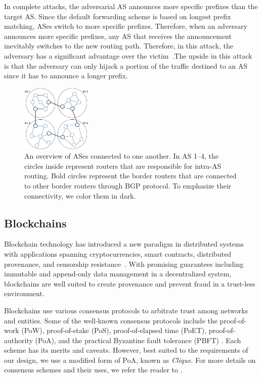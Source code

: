 \documentclass[5p]{elsarticle}
\begin{document}
In complete attacks, the adversarial AS announces more specific prefixes than the target AS. Since the default forwarding scheme is based on longest prefix matching, ASes switch to more specific prefixes. Therefore, when an adversary announces more specific prefixes, any AS that receives the announcement inevitably switches to the new routing path. Therefore, in this attack, the adversary has a significant advantage over the victim~\cite{BGPHijack}.The upside in this attack is that the adversary can only hijack a portion of the traffic destined to an AS since it has to announce a longer prefix.

\begin{figure}[t]
\begin{center}
\includegraphics[width=0.30\textwidth]{fig/ASes.pdf}
\caption{An overview of ASes connected to one another. In AS 1--4, the circles inside represent routers that are responsible for intra-AS routing. Bold circles represent the border routers that are connected to other border routers through BGP protocol. To emphasize their connectivity, we color them in dark.  } 
\label{fig:ASes}
\end{center}

\end{figure}


\subsection{Blockchains} \label{sec:BC}
Blockchain technology has introduced a new paradigm in distributed systems with applications spanning cryptocurrencies, smart contracts, distributed provenance, and censorship resistance~\cite{NeisseSN17,Omohundro14,GovernatoriIMRS18,AhmadSBM18}. With promising guarantees including immutable and append-only data management in a decentralized system, blockchains are well suited to create provenance and prevent fraud in a trust-less environment. 

Blockchains use various consensus protocols to arbitrate trust among networks and entities. Some of the well-known consensus protocols include the proof-of-work (PoW), proof-of-stake (PoS), proof-of-elapsed time (PoET), proof-of-authority (PoA), and the practical Byzantine fault tolerance (PBFT) \cite{SaadM18,SaadNKM18}. Each scheme has its merits and caveats. However, best suited to the requirements of our design, we use a modified form of PoA, known as {\em Clique}. For more details on consensus schemes and their uses, we refer the reader to \cite{Bano:2017b}.
\end{document}

